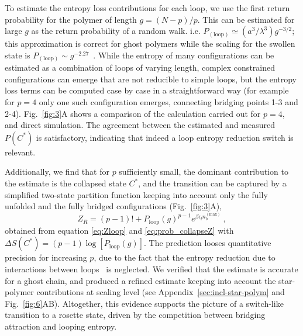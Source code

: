 \documentclass[
preprint,
a4paper,
12pt,
superscriptaddress,
pre]{revtex4}
\begin{document}
To estimate the entropy loss contributions for each loop, we use the
first return probability for the polymer of length $g = (N-p)/p$. This
can be estimated for large $g$ as the return probability of a random
walk. i.e. $P_\mathrm{(loop)} \simeq (a^3/\lambda^3) g^{-3/2}$; this
approximation is correct for ghost polymers while the scaling for the
swollen state is $P_\mathrm{(loop)} \sim
g^{-2.27}$~\cite{Marenduzzo2006c}.
%
While the entropy of many configurations can be estimated as a
combination of loops of varying length, complex constrained
configurations can emerge that are not reducible to simple loops, but
the entropy loss terms can be computed case by case in a
straightforward way (for example for $p=4$ only one such configuration
emerges, connecting bridging points 1-3 and 2-4).  Fig.~\ref{fig:3}A
shows a comparison of the calculation carried out for $p=4$, and
direct simulation.  The agreement between the estimated and
measured $P(C^*)$ is satisfactory, indicating that indeed a loop
entropy reduction switch is relevant. 

%
Additionally, we find that for $p$ sufficiently small, the dominant
contribution to the estimate is the collapsed state $C^*$, and the
transition can be captured by a simplified two-state partition
function keeping into account only the fully unfolded and the fully
bridged configurations (Fig.~\ref{fig:3}A),
%
%
\begin{equation}
  Z_R = (p - 1)! + P_\mathrm{loop}(g)^{p-1}
            e^{\beta \epsilon_l n_b^{\mathrm{(max)}}} \ ,
  \label{eq:Zloop_red}
\end{equation}
%
%
obtained from equation \ref{eq:Zloop} and \ref{eq:prob_collapseZ} with
$\Delta S(C^*) = (p - 1)\log\left[ P_\mathrm{loop}(g)\right]$.
The prediction looses quantitative precision for increasing $p$, due
to the fact that the entropy reduction due to interactions between
loops~\cite{Hsu2004} is neglected. We verified that the estimate is
accurate for a ghost chain, and produced a refined estimate keeping
into account the star-polymer contributions at scaling level (see
Appendix~\ref{sec:incl-star-polym} and
Fig.~\ref{fig:6}AB). Altogether, this evidence supports the picture of
a switch-like transition to a rosette state, driven by the competition
between bridging attraction and looping entropy.  
\end{document}
